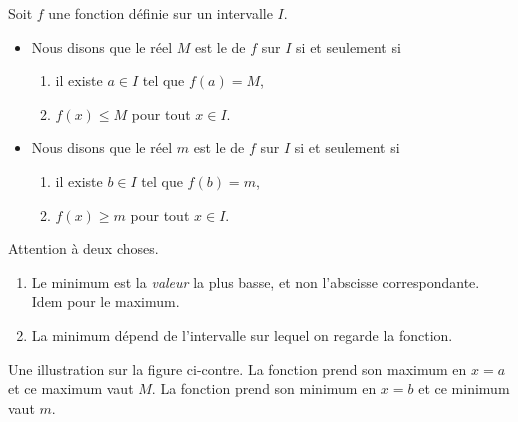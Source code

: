 \begin{definition}
      Soit $f$ une fonction définie sur un intervalle \( I\).
      \begin{itemize}
            \item 
                Nous disons que le réel \( M\) est le  de \( f\) sur $I$ si et seulement si 
                \begin{enumerate}
                    \item
                        il existe $ a\in I$ tel que $f(a)=M$,
                    \item
                        \( f(x)\leq M\) pour tout $x\in I$.
                \end{enumerate}
                
          \item 
                Nous disons que le réel \( m\) est le  de \( f\) sur $I$ si et seulement si
                \begin{enumerate}
                    \item
                        il existe $ b\in I$ tel que $f(b)=m$,
                    \item
                        $f(x)\geq m$ pour tout \( x\in I\).
                \end{enumerate}
      \end{itemize}
\end{definition}

\begin{center}
   
\end{center}

\begin{remark}
    Attention à deux choses.
    \begin{enumerate}
        \item
            Le minimum est la \emph{valeur} la plus basse, et non l'abscisse correspondante. Idem pour le maximum. 
        \item
            La minimum dépend de l'intervalle sur lequel on regarde la fonction.
    \end{enumerate}
\end{remark}

Une illustration sur la figure ci-contre. La fonction prend son maximum en \( x=a\) et ce maximum vaut \( M\). La fonction prend son minimum en \( x=b\) et ce minimum vaut \( m\).

